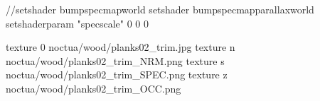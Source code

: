 //setshader bumpspecmapworld
setshader bumpspecmapparallaxworld
setshaderparam "specscale" 0 0 0

texture 0 noctua/wood/planks02_trim.jpg
texture n noctua/wood/planks02_trim_NRM.png
texture s noctua/wood/planks02_trim_SPEC.png
texture z noctua/wood/planks02_trim_OCC.png

